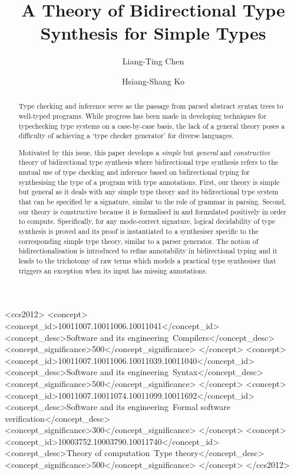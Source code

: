 \documentclass[acmsmall,screen]{acmart}
\theoremstyle{acmdefinition}
\begin{document}
\author{Liang-Ting Chen}
\author{Hsiang-Shang Ko}


\title{A Theory of Bidirectional Type Synthesis for Simple Types}

\begin{abstract}
  Type checking and inference serve as the passage from parsed abstract syntax trees to well-typed programs.
  While progress has been made in developing techniques for typechecking type systems on a case-by-case basis, the lack of a general theory poses a difficulty of achieving a `type checker generator' for diverse languages.

  Motivated by this issue, this paper develops a \emph{simple} but \emph{general} and \emph{constructive} theory of bidirectional type synthesis where bidirectional type synthesis refers to the mutual use of type checking and inference based on bidirectional typing for synthesising the type of a program with type annotations.
  First, our theory is simple but general as it deals with any simple type theory and its bidirectional type system that can be specified by a signature, similar to the role of grammar in parsing.
  Second, our theory is constructive because it is formalised in \Agda and formulated positively in order to compute.
  Specifically, for any mode-correct signature, logical decidability of type synthesis is proved and its proof is instantiated to a synthesiser specific to the corresponding simple type theory, similar to a parser generator.
  The notion of bidirectionalisation is introduced to refine annotability in bidirectional typing and it leads to the trichotomy of raw terms which models a practical type synthesiser that triggers an exception when its input has missing annotations.
\end{abstract}

\begin{CCSXML}
<ccs2012>
   <concept>
       <concept_id>10011007.10011006.10011041</concept_id>
       <concept_desc>Software and its engineering~Compilers</concept_desc>
       <concept_significance>500</concept_significance>
       </concept>
   <concept>
       <concept_id>10011007.10011006.10011039.10011040</concept_id>
       <concept_desc>Software and its engineering~Syntax</concept_desc>
       <concept_significance>500</concept_significance>
       </concept>
   <concept>
       <concept_id>10011007.10011074.10011099.10011692</concept_id>
       <concept_desc>Software and its engineering~Formal software verification</concept_desc>
       <concept_significance>300</concept_significance>
       </concept>
   <concept>
       <concept_id>10003752.10003790.10011740</concept_id>
       <concept_desc>Theory of computation~Type theory</concept_desc>
       <concept_significance>500</concept_significance>
       </concept>
 </ccs2012>
\end{CCSXML}
\end{document}
